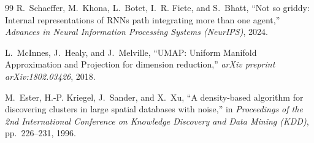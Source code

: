 \documentclass[11pt]{article}
\begin{document}
\begin{thebibliography}{99}
R.~Schaeffer, M.~Khona, L.~Botet, I.~R. Fiete, and S.~Bhatt,
``Not so griddy: Internal representations of RNNs path integrating more than one agent,''
\textit{Advances in Neural Information Processing Systems (NeurIPS)}, 2024.

L.~McInnes, J.~Healy, and J.~Melville,
``UMAP: Uniform Manifold Approximation and Projection for dimension reduction,''
\textit{arXiv preprint arXiv:1802.03426}, 2018.

M.~Ester, H.-P. Kriegel, J.~Sander, and X.~Xu,
``A density-based algorithm for discovering clusters in large spatial databases with noise,''
in \textit{Proceedings of the 2nd International Conference on Knowledge Discovery and Data Mining (KDD)}, pp.~226--231, 1996.

\end{thebibliography}
\end{document}
